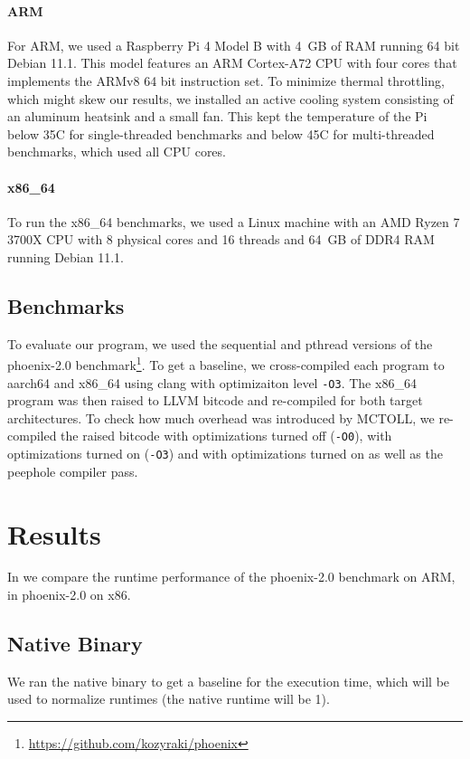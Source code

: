 \paragraph{ARM} For ARM, we used a Raspberry Pi 4 Model B with 4~GB of RAM running 64 bit Debian 11.1.
This model features an ARM Cortex-A72 CPU with four cores that implements the ARMv8 64 bit instruction set.
To minimize thermal throttling, which might skew our results, we installed an active cooling system consisting of an aluminum heatsink and a small fan.
This kept the temperature of the Pi below 35\textdegree{}C for single-threaded benchmarks and below 45\textdegree{}C for multi-threaded benchmarks, which used all CPU cores.

\paragraph{x86\_64} To run the x86\_64 benchmarks, we used a Linux machine with an AMD Ryzen 7 3700X CPU with 8 physical cores and 16 threads and 64~GB of DDR4 RAM running Debian 11.1.

\subsection{Benchmarks}\label{subsec:benchmarks}
To evaluate our program, we used the sequential and pthread versions of the phoenix-2.0 benchmark\footnote{\url{https://github.com/kozyraki/phoenix}}.
To get a baseline, we cross-compiled each program to aarch64 and x86\_64 using clang with optimizaiton level \texttt{-O3}.
The x86\_64 program was then raised to LLVM bitcode and re-compiled for both target architectures.
To check how much overhead was introduced by MCTOLL, we re-compiled the raised bitcode with optimizations turned off (\texttt{-O0}), with optimizations turned on (\texttt{-O3}) and with optimizations turned on as well as the peephole compiler pass.

\section{Results}\label{sec:results}

In  we compare the runtime performance of the phoenix-2.0 benchmark on ARM, in  phoenix-2.0 on x86.

\subsection{Native Binary}\label{subsec:native-binary}
We ran the native binary to get a baseline for the execution time, which will be used to normalize runtimes (the native runtime will be 1).

